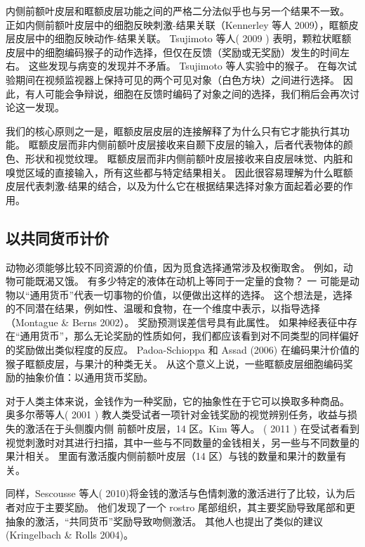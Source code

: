 内侧前额叶皮层和眶额皮层功能之间的严格二分法似乎也与另一个结果不一致。
正如内侧前额叶皮层中的细胞反映刺激-结果关联（Kennerley 等人 2009），眶额皮层皮层中的细胞反映动作-结果关联。
Tsujimoto 等人( 2009 ) 表明，颗粒状眶额皮层中的细胞编码猴子的动作选择，但仅在反馈（奖励或无奖励）发生的时间左右。
这些发现与病变的发现并不矛盾。
Tsujimoto 等人实验中的猴子。
在每次试验期间在视频监视器上保持可见的两个可见对象（白色方块）之间进行选择。
因此，有人可能会争辩说，细胞在反馈时编码了对象之间的选择，我们稍后会再次讨论这一发现。\par


我们的核心原则之一是，眶额皮层皮层的连接解释了为什么只有它才能执行其功能。
眶额皮层而非内侧前额叶皮层接收来自颞下皮层的输入，后者代表物体的颜色、形状和视觉纹理。
眶额皮层而非内侧前额叶皮层接收来自皮层味觉、内脏和嗅觉区域的直接输入，所有这些都与特定结果相关。
因此很容易理解为什么眶额皮层代表刺激-结果的结合，以及为什么它在根据结果选择对象方面起着必要的作用。\par



\subsection{以共同货币计价}

动物必须能够比较不同资源的价值，因为觅食选择通常涉及权衡取舍。
例如，动物可能既渴又饿。
有多少特定的液体在动机上等同于一定量的食物？ 一
可能是动物以“通用货币”代表一切事物的价值，以便做出这样的选择。
这个想法是，选择的不同潜在结果，例如性、温暖和食物，在一个维度中表示，以指导选择（Montague \& Berns 2002）。
奖励预测误差信号具有此属性。
如果神经表征中存在“通用货币”，那么无论奖励的性质如何，我们都应该看到对不同类型的同样偏好的奖励做出类似程度的反应。
Padoa-Schioppa 和 Assad (2006) 在编码果汁价值的猴子眶额皮层，与果汁的种类无关。
从这个意义上说，一些眶额皮层细胞编码奖励的抽象价值：以通用货币奖励。\par


对于人类主体来说，金钱作为一种奖励，它的抽象性在于它可以换取多种商品。
奥多尔蒂等人( 2001 ) 教人类受试者一项针对金钱奖励的视觉辨别任务，收益与损失的激活在于头侧腹内侧 前额叶皮层，14 区。Kim 等人。 ( 2011 ) 在受试者看到视觉刺激时对其进行扫描，其中一些与不同数量的金钱相关，另一些与不同数量的果汁相关。
里面有激活腹内侧前额叶皮层（14 区）与钱的数量和果汁的数量有关。\par


同样，Sescousse 等人( 2010)将金钱的激活与色情刺激的激活进行了比较，认为后者对应于主要奖励。
他们发现了一个 rostro 尾部组织，其主要奖励导致尾部和更抽象的激活，“共同货币”奖励导致吻侧激活。
其他人也提出了类似的建议 (Kringelbach \& Rolls 2004)。\par


